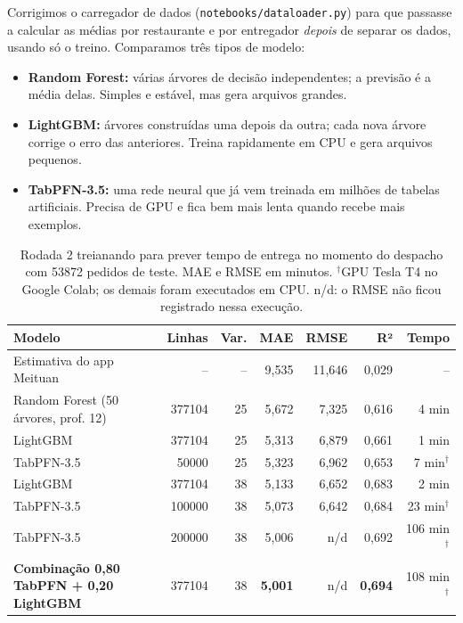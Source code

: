 \documentclass[11pt,a4paper]{article}
\begin{document}
Corrigimos o carregador de dados (\texttt{notebooks/dataloader.py}) para que passasse a calcular as médias
por restaurante e por entregador \emph{depois} de separar os dados, usando só o treino. Comparamos três tipos de modelo:
\begin{itemize}
  \item \textbf{Random Forest:} várias árvores de decisão independentes; a previsão é a média
        delas. Simples e estável, mas gera arquivos grandes.
  \item \textbf{LightGBM:} árvores construídas uma depois da outra; cada nova árvore corrige o
        erro das anteriores. Treina rapidamente em CPU e gera arquivos pequenos.
  \item \textbf{TabPFN-3.5:} uma rede neural que já vem treinada em milhões de tabelas
        artificiais. Precisa de GPU e fica bem mais lenta quando recebe mais exemplos.
\end{itemize}

\begin{table}[H]
\centering\footnotesize
\begin{tabular}{l r r r r r r}
\toprule
Modelo & Linhas & Var. & MAE & RMSE & R² & Tempo \\
\midrule
Estimativa do app Meituan & -- & -- & 9,535 & 11,646 & 0,029 & -- \\
Random Forest (50 árvores, prof. 12) & \num{377104} & 25 & 5,672 & 7,325 & 0,616 & 4 min \\
LightGBM & \num{377104} & 25 & 5,313 & 6,879 & 0,661 & 1 min \\
TabPFN-3.5 & \num{50000} & 25 & 5,323 & 6,962 & 0,653 & 7 min$^\dagger$ \\
LightGBM & \num{377104} & 38 & 5,133 & 6,652 & 0,683 & 2 min \\
TabPFN-3.5 & \num{100000} & 38 & 5,073 & 6,642 & 0,684 & 23 min$^\dagger$ \\
TabPFN-3.5 & \num{200000} & 38 & 5,006 & n/d & 0,692 & 106 min$^\dagger$ \\
\textbf{Combinação 0,80 TabPFN + 0,20 LightGBM} & \num{377104} & 38 & \textbf{5,001} & n/d & \textbf{0,694} & 108 min$^\dagger$ \\
\bottomrule
\end{tabular}
\caption{Rodada 2 treianando para prever tempo de entrega no momento do despacho com \num{53872} pedidos de teste. MAE e RMSE em minutos.
$^\dagger$GPU Tesla T4 no Google Colab; os demais foram executados em CPU.
n/d: o RMSE não ficou registrado nessa execução.}
\label{tab:r2}
\end{table}
\end{document}
